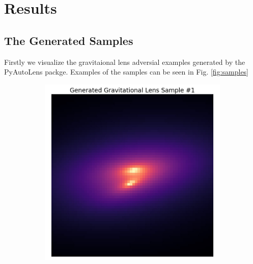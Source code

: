 \documentclass[12pt]{article}
\begin{document}
\section{Results}
\subsection{The Generated Samples}
Firstly we visualize the gravitaional lens adversial examples generated by the PyAutoLens\cite{pyautolens} packge. Examples of the samples can be seen in Fig. \ref{fig:samples}


\begin{figure}[thb]
    \centering
    
    \begin{minipage}{\columnwidth}
	\begin{subfigure}{0.5\columnwidth}
    \includegraphics[width=\columnwidth]{../figures/img1.jpg}
    \caption{}
    \label{fig:sample1}
    \end{subfigure}
    \begin{subfigure}{0.5\columnwidth}

\end{subfigure}
\end{minipage}
\end{figure}
\end{document}
